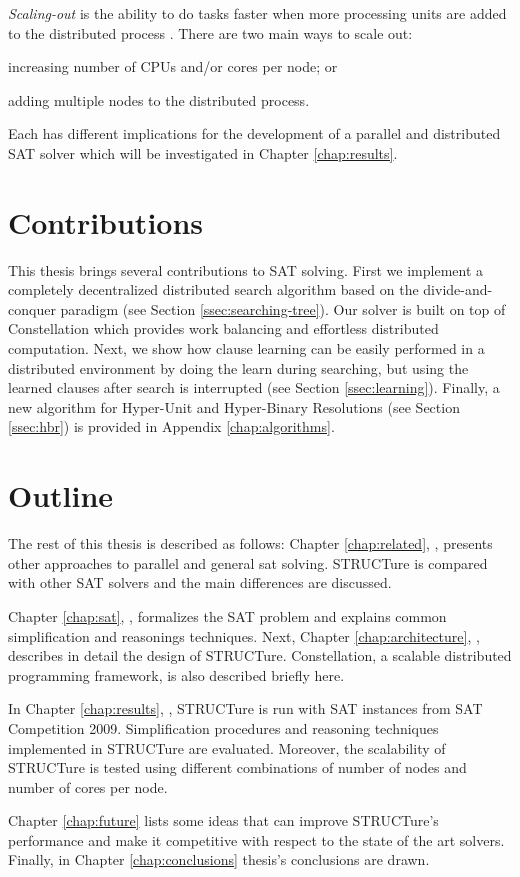 \emph{Scaling-out} is the ability to do tasks faster when
more processing units are added to the distributed process
\cite{citeulike:1567858}. There are two main ways to scale
out:
\begin{inparaenum}[a)]
  \item increasing number of CPUs and/or cores per node; or
  \item adding multiple nodes to the distributed process.
\end{inparaenum} Each has different implications for the development
of a parallel and distributed SAT solver which will be investigated in
Chapter \ref{chap:results}.


\section{Contributions}

This thesis brings several contributions to SAT solving. First
we implement a completely decentralized distributed search
algorithm based on the divide-and-conquer paradigm (see Section
\ref{ssec:searching-tree}).  Our solver is built on top of
Constellation which provides work balancing and effortless
distributed computation.  Next, we show how clause learning can be
easily performed in a distributed environment by doing the learn
during searching, but using the learned clauses after search is
interrupted (see Section \ref{ssec:learning}).  Finally, a new
algorithm for Hyper-Unit and Hyper-Binary Resolutions (see Section
\ref{ssec:hbr}) is provided in Appendix \ref{chap:algorithms}.


\section{Outline}

The rest of this thesis is described as follows:  Chapter
\ref{chap:related}, \emph{}, presents other
approaches to parallel and general sat solving. STRUCTure is compared
with other SAT solvers and the main differences are discussed.

Chapter \ref{chap:sat}, \emph{}, formalizes
the SAT problem and explains common simplification and
reasonings techniques.  Next, Chapter \ref{chap:architecture},
\emph{}, describes in detail the design
of STRUCTure. Constellation, a scalable distributed programming
framework, is also described briefly here.

In Chapter \ref{chap:results}, \emph{}, STRUCTure is
run with SAT instances from SAT Competition 2009. Simplification
procedures and reasoning techniques implemented in STRUCTure are
evaluated. Moreover, the scalability of STRUCTure is tested using
different combinations of number of nodes and number of cores
per node.

Chapter \ref{chap:future} lists some ideas that can improve
STRUCTure's performance and make it competitive with respect to the
state of the art solvers. Finally, in Chapter \ref{chap:conclusions}
thesis's conclusions are drawn.
